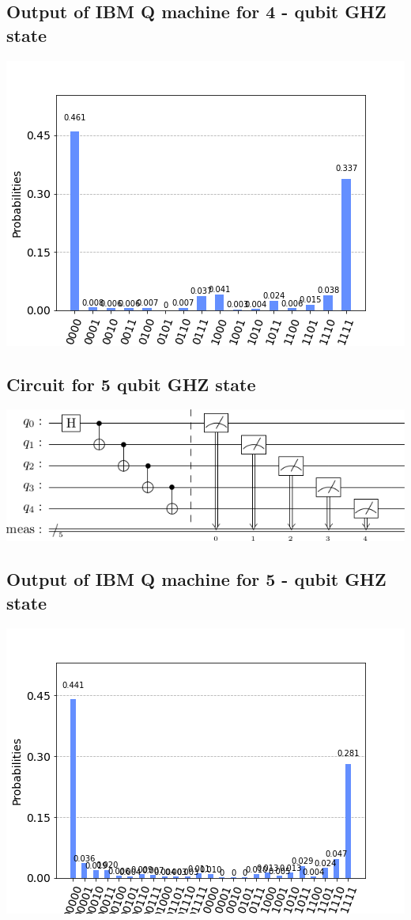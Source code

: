 \documentclass[a4paper]{article}
\begin{document}
\begin{answer}[Question 2]
    \subsection*{Output of IBM Q machine for 4 - qubit GHZ state}
        \includegraphics[scale=0.6]{w-4-out.png}
    \subsection*{Circuit for 5 qubit GHZ state}
        \includegraphics[scale=0.6]{ghz-5.png}
    \subsection*{Output of IBM Q machine for 5 - qubit GHZ state}
        \includegraphics[scale=0.6]{w-5-out.png}
    \end{answer}
\end{document}
